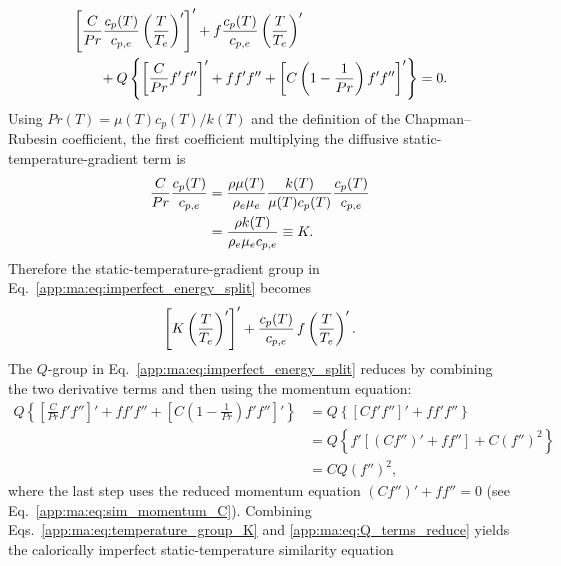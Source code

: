\begin{align}
  &
  \left[
    \frac{C}{Pr}
    \frac{c_p(T)}{c_{p,e}}
    \left(\frac{T}{T_e}\right)'
  \right]'
  +
  f\frac{c_p(T)}{c_{p,e}}
  \left(\frac{T}{T_e}\right)'
  \nonumber\\
  &\qquad
  +
  Q\left\{
    \left[\frac{C}{Pr}f'f''\right]'
    +
    ff'f''
    +
    \left[C\left(1-\frac{1}{Pr}\right)f'f''\right]'
  \right\}
  =
  0.
  \label{app:ma:eq:imperfect_energy_split}
\end{align}
Using \(Pr(T)=\mu(T)c_p(T)/k(T)\) and the definition of the Chapman--Rubesin coefficient, the first coefficient multiplying the diffusive static-temperature-gradient term is
\begin{align}
  \frac{C}{Pr}\frac{c_p(T)}{c_{p,e}}
  &=
  \frac{\rho\mu(T)}{\rho_e\mu_e}
  \frac{k(T)}{\mu(T) c_p(T)}
  \frac{c_p(T)}{c_{p,e}}
  \nonumber\\
  &=
  \frac{\rho k(T)}{\rho_e\mu_e c_{p,e}}
  \equiv K.
  \label{app:ma:eq:K_from_CPr}
\end{align}
Therefore the static-temperature-gradient group in Eq.~\eqref{app:ma:eq:imperfect_energy_split} becomes
\begin{equation}
  \left[
    K\left(\frac{T}{T_e}\right)'
  \right]'
  +
  \frac{c_p(T)}{c_{p,e}}\,
  f\left(\frac{T}{T_e}\right)'.
  \label{app:ma:eq:temperature_group_K}
\end{equation}
The \(Q\)-group in Eq.~\eqref{app:ma:eq:imperfect_energy_split} reduces by combining the two derivative terms and then using the momentum equation:
\begin{align}
  Q\left\{
  \left[\frac{C}{Pr}f'f''\right]'
  +
  ff'f''
  +
  \left[C\left(1-\frac{1}{Pr}\right)f'f''\right]'
  \right\}
  &=
  Q\left\{
  \left[Cf'f''\right]' + ff'f''
  \right\}
  \nonumber\\
  &=
  Q\left\{
  f'\left[\left(Cf''\right)' + ff''\right]
  +
  C(f'')^2
  \right\}
  \nonumber\\
  &=
  CQ(f'')^2,
  \label{app:ma:eq:Q_terms_reduce}
\end{align}
where the last step uses the reduced momentum equation \(\left(Cf''\right)'+ff''=0\) (see Eq.~\eqref{app:ma:eq:sim_momentum_C}). Combining Eqs.~\eqref{app:ma:eq:temperature_group_K} and \eqref{app:ma:eq:Q_terms_reduce} yields the calorically imperfect static-temperature similarity equation


